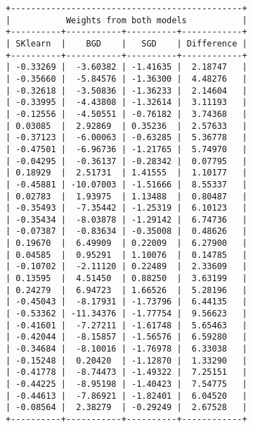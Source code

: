 \documentclass[11pt]{article}
\makeatletter
\newcommand{\boxspacing}{\kern\kvtcb@left@rule\kern\kvtcb@boxsep}
\newcommand{\prompt}[4]{
        {\ttfamily\llap{{\color{#2}[#3]:\hspace{3pt}#4}}\vspace{-\baselineskip}}
    }
\makeatother
\begin{document}
    \begin{Verbatim}[commandchars=\\\{\}]
+----------------------------------------------+
|           Weights from both models           |
+----------+-----------+----------+------------+
| SKlearn  |    BGD    |   SGD    | Difference |
+----------+-----------+----------+------------+
| -0.33269 |  -3.60382 | -1.41635 |  2.18747   |
| -0.35660 |  -5.84576 | -1.36300 |  4.48276   |
| -0.32618 |  -3.50836 | -1.36233 |  2.14604   |
| -0.33995 |  -4.43808 | -1.32614 |  3.11193   |
| -0.12556 |  -4.50551 | -0.76182 |  3.74368   |
| 0.03085  |  2.92869  | 0.35236  |  2.57633   |
| -0.37123 |  -6.00063 | -0.63285 |  5.36778   |
| -0.47501 |  -6.96736 | -1.21765 |  5.74970   |
| -0.04295 |  -0.36137 | -0.28342 |  0.07795   |
| 0.18929  |  2.51731  | 1.41555  |  1.10177   |
| -0.45881 | -10.07003 | -1.51666 |  8.55337   |
| 0.02783  |  1.93975  | 1.13488  |  0.80487   |
| -0.35493 |  -7.35442 | -1.25319 |  6.10123   |
| -0.35434 |  -8.03878 | -1.29142 |  6.74736   |
| -0.07387 |  -0.83634 | -0.35008 |  0.48626   |
| 0.19670  |  6.49909  | 0.22009  |  6.27900   |
| 0.04585  |  0.95291  | 1.10076  |  0.14785   |
| -0.10702 |  -2.11120 | 0.22489  |  2.33609   |
| 0.13595  |  4.51450  | 0.88250  |  3.63199   |
| 0.24279  |  6.94723  | 1.66526  |  5.28196   |
| -0.45043 |  -8.17931 | -1.73796 |  6.44135   |
| -0.53362 | -11.34376 | -1.77754 |  9.56623   |
| -0.41601 |  -7.27211 | -1.61748 |  5.65463   |
| -0.42044 |  -8.15857 | -1.56576 |  6.59280   |
| -0.34684 |  -8.10016 | -1.76978 |  6.33038   |
| -0.15248 |  0.20420  | -1.12870 |  1.33290   |
| -0.41778 |  -8.74473 | -1.49322 |  7.25151   |
| -0.44225 |  -8.95198 | -1.40423 |  7.54775   |
| -0.44613 |  -7.86921 | -1.82401 |  6.04520   |
| -0.08564 |  2.38279  | -0.29249 |  2.67528   |
+----------+-----------+----------+------------+
    \end{Verbatim}

    \begin{tcolorbox}[breakable, size=fbox, boxrule=1pt, pad at break*=1mm,colback=cellbackground, colframe=cellborder]
\prompt{In}{incolor}{29}{\boxspacing}
\begin{Verbatim}[commandchars=\\\{\}]

\end{Verbatim}
\end{tcolorbox}


    
    
    
\end{document}
